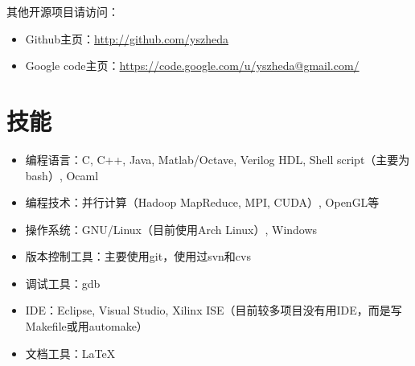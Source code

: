 \documentclass[letterpaper]{article}
\begin{document}
\begin{itemize}
\begin{itemize}
%
	\end{itemize}

\end{itemize}

其他开源项目请访问：
\begin{itemize}
  \item Github主页：\url{http://github.com/yszheda} 
  \item Google code主页：\url{https://code.google.com/u/yszheda@gmail.com/}
\end{itemize}

\section*{技能}
\begin{itemize}
\item 编程语言：C, C++, Java, Matlab/Octave, Verilog HDL, Shell script（主要为bash）, Ocaml
\item 编程技术：并行计算（Hadoop MapReduce, MPI, CUDA）, OpenGL等
\item 操作系统：GNU/Linux（目前使用Arch Linux）, Windows
\item 版本控制工具：主要使用git，使用过svn和cvs
\item 调试工具：gdb		
\item IDE：Eclipse, Visual Studio, Xilinx ISE（目前较多项目没有用IDE，而是写Makefile或用automake）
\item 文档工具：\LaTeX
\end{itemize}
\end{document}
